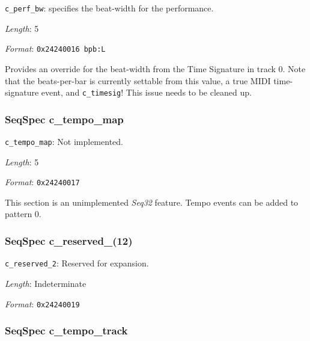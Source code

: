    \begin{description}
      \item \texttt{c\_perf\_bw}:
         specifies the beat-width for the performance.
      \item \textsl{Length}: 5
      \item \textsl{Format}: \texttt{0x24240016 bpb:L}
   \end{description}

   Provides an override for the beat-width from the Time Signature in track 0.
   Note that the beats-per-bar is currently settable from this value,
   a true MIDI time-signature event, and \texttt{c\_timesig}!
   This issue needs to be cleaned up.

\subsubsection{SeqSpec c\_tempo\_map}
\label{subsubsec:midi_format_track_seqspec_tempo_map}

   \begin{description}
      \item \texttt{c\_tempo\_map}: Not implemented.
      \item \textsl{Length}: 5
      \item \textsl{Format}: \texttt{0x24240017}
   \end{description}

   This section is an unimplemented \textsl{Seq32} feature.
   Tempo events can be added to pattern 0.

\subsubsection{SeqSpec c\_reserved\_(12)}
\label{subsubsec:midi_format_track_seqspec_reserved_1_2}

   \begin{description}
      \item \texttt{c\_reserved\_2}: Reserved for expansion.
      \item \textsl{Length}: Indeterminate
      \item \textsl{Format}: \texttt{0x24240019}
   \end{description}

\subsubsection{SeqSpec c\_tempo\_track}
\label{subsubsec:midi_format_track_seqspec_tempo_track}

